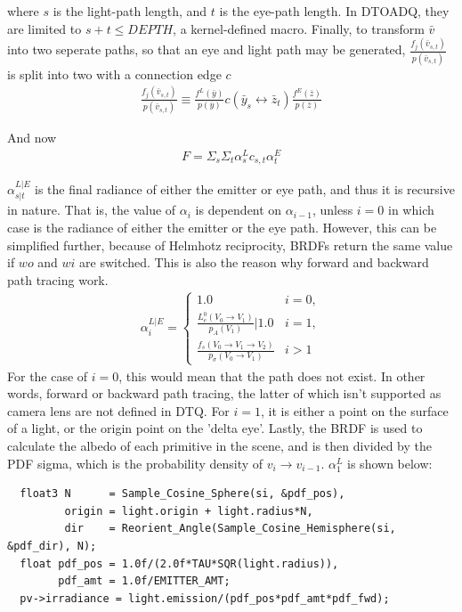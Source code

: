 \message{ !name(test.tex)}\documentclass{article}
\begin{document}
    where $s$ is the light-path length, and $t$ is the eye-path length. In
    DTOADQ, they are limited to $s+t \leq DEPTH$, a kernel-defined macro.
Finally, to transform $\bar{v}$ into two seperate paths, so that an eye and
light path may be generated, $\frac{f_j(\bar{v}_{s, t})}{p(\bar{v}_{s, t})}$ is
split into two with a connection edge $c$
  \begin{align}
    \frac{f_j(\bar{v}_{s, t})}{p(\bar{v}_{s, t})} \equiv
    \frac{f^L(\bar{y})}{p(\bar{y})} c(\bar{y}_s \leftrightarrow \bar{z}_t)
    \frac{f^E(\bar{z})}{p(\bar{z})}  
  \end{align}

    And now
  \begin{align}
    F = \Sigma_s\Sigma_t \alpha^L_s c_{s, t} \alpha^E_t
  \end{align}

  $\alpha_{s|t}^{L|E}$ is the final radiance of either the emitter or eye path,
  and thus it is recursive in nature. That is, the value of $\alpha_i$ is
  dependent on $\alpha_{i-1}$, unless $i = 0$ in which case is the radiance of
  either the emitter or the eye path. However, this can be simplified further,
because of Helmhotz reciprocity, BRDFs return the same value if $wo$ and $wi$
are switched. This is also the reason why forward and backward path tracing
work.
  \begin{align}
    \alpha^{L|E}_i =
    \begin{cases}
      1.0 &i = 0,\\
      \frac{
      L_e^0(V_0 \rightarrow V_1)}{p_A(V_1)} | 1.0 &i = 1,\\
      \frac{f_s(V_0 \rightarrow V_1 \rightarrow V_2)}{p_{\sigma}(V_0
      \rightarrow V_1)} &i > 1
    \end{cases}
  \end{align}
    For the case of $i = 0$, this would mean that the path does not exist. In
other words, forward or backward path tracing, the latter of which isn't
supported as camera lens are not defined in DTQ. For $i = 1$, it is either a
point on the surface of a light, or the origin point on the 'delta eye'. Lastly,
the BRDF is used to calculate the albedo of each primitive in the scene, and is
then divided by the PDF sigma, which is the probability density of $v_i
\rightarrow v_{i-1}$. $\alpha_1^L$ is shown below:

\begin{lstlisting}
  float3 N      = Sample_Cosine_Sphere(si, &pdf_pos),
         origin = light.origin + light.radius*N,
         dir    = Reorient_Angle(Sample_Cosine_Hemisphere(si, &pdf_dir), N);
  float pdf_pos = 1.0f/(2.0f*TAU*SQR(light.radius)),
        pdf_amt = 1.0f/EMITTER_AMT;
  pv->irradiance = light.emission/(pdf_pos*pdf_amt*pdf_fwd);
\end{lstlisting}
\end{document}
